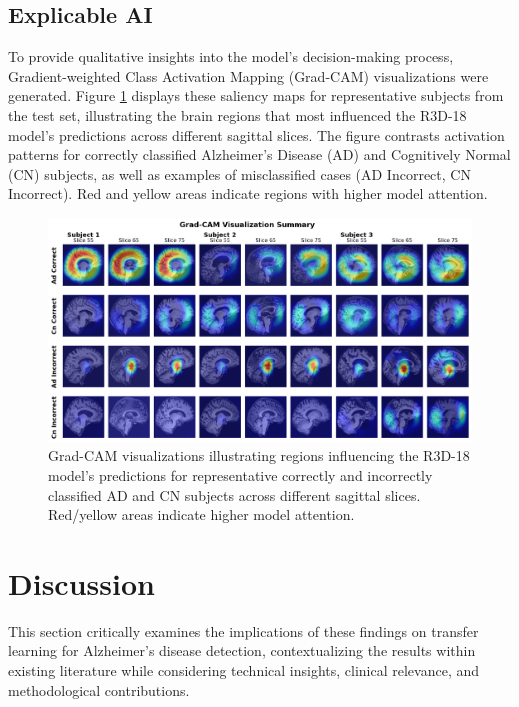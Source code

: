 \documentclass[11pt, a4paper]{article}
\begin{document}
\subsection{Explicable AI}

To provide qualitative insights into the model's decision-making process, Gradient-weighted Class Activation Mapping (Grad-CAM) visualizations were generated. Figure \ref{fig:gradcam} displays these saliency maps for representative subjects from the test set, illustrating the brain regions that most influenced the R3D-18 model's predictions across different sagittal slices. The figure contrasts activation patterns for correctly classified Alzheimer's Disease (AD) and Cognitively Normal (CN) subjects, as well as examples of misclassified cases (AD Incorrect, CN Incorrect). Red and yellow areas indicate regions with higher model attention.

\begin{figure}[htbp]
  \centering
  \includegraphics[width=\textwidth]{figures/gradcam.png}
  \caption{Grad-CAM visualizations illustrating regions influencing the R3D-18 model's predictions for representative correctly and incorrectly classified AD and CN subjects across different sagittal slices. Red/yellow areas indicate higher model attention.}
  \label{fig:gradcam}
\end{figure}

\section{Discussion}
\label{sec:discussion}

This section critically examines the implications of these findings on transfer learning for Alzheimer's disease detection, contextualizing the results within existing literature while considering technical insights, clinical relevance, and methodological contributions.
\end{document}

